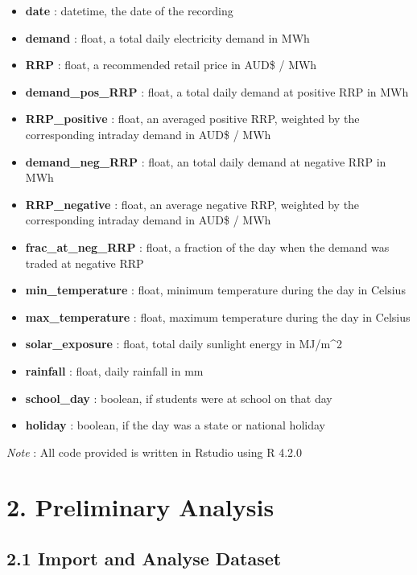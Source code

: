 \documentclass[
]{article}
\providecommand{\tightlist}{%
  \setlength{\itemsep}{0pt}\setlength{\parskip}{0pt}}
\begin{document}
\begin{itemize}
\tightlist
\item
  \textbf{date} : datetime, the date of the recording
\item
  \textbf{demand} : float, a total daily electricity demand in MWh
\item
  \textbf{RRP} : float, a recommended retail price in AUD\$ / MWh
\item
  \textbf{demand\_pos\_RRP} : float, a total daily demand at positive
  RRP in MWh
\item
  \textbf{RRP\_positive} : float, an averaged positive RRP, weighted by
  the corresponding intraday demand in AUD\$ / MWh
\item
  \textbf{demand\_neg\_RRP} : float, an total daily demand at negative
  RRP in MWh
\item
  \textbf{RRP\_negative} : float, an average negative RRP, weighted by
  the corresponding intraday demand in AUD\$ / MWh
\item
  \textbf{frac\_at\_neg\_RRP} : float, a fraction of the day when the
  demand was traded at negative RRP
\item
  \textbf{min\_temperature} : float, minimum temperature during the day
  in Celsius
\item
  \textbf{max\_temperature} : float, maximum temperature during the day
  in Celsius
\item
  \textbf{solar\_exposure} : float, total daily sunlight energy in
  MJ/m\^{}2
\item
  \textbf{rainfall} : float, daily rainfall in mm
\item
  \textbf{school\_day} : boolean, if students were at school on that day
\item
  \textbf{holiday} : boolean, if the day was a state or national holiday
\end{itemize}

\emph{Note} : All code provided is written in Rstudio using R 4.2.0

\hypertarget{preliminary-analysis}{%
\section{2. Preliminary Analysis}\label{preliminary-analysis}}

\hypertarget{import-and-analyse-dataset}{%
\subsection{2.1 Import and Analyse
Dataset}\label{import-and-analyse-dataset}}
\end{document}
